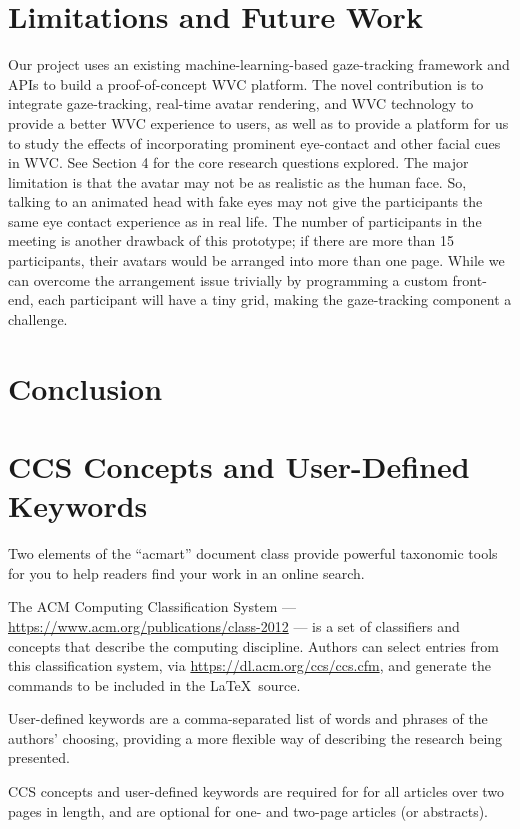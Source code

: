 \documentclass[sigconf,authordraft]{acmart}
\begin{document}
\section{Limitations and Future Work}
Our project uses an existing machine-learning-based gaze-tracking framework and APIs to build a proof-of-concept WVC platform. The novel contribution is to integrate gaze-tracking, real-time avatar rendering, and WVC technology to provide a better WVC experience to users, as well as to provide a platform for us to study the effects of incorporating prominent eye-contact and other facial cues in WVC. See Section 4 for the core research questions explored.
The major limitation is that the avatar may not be as realistic as the human face. So, talking to an animated head with fake eyes may not give the participants the same eye contact experience as in real life. The number of participants in the meeting is another drawback of this prototype; if there are more than 15 participants, their avatars would be arranged into more than one page. While we can overcome the arrangement issue trivially by programming a custom front-end, each participant will have a tiny grid, making the gaze-tracking component a challenge. 

\section{Conclusion}

\section{CCS Concepts and User-Defined Keywords}

Two elements of the ``acmart'' document class provide powerful
taxonomic tools for you to help readers find your work in an online
search.

The ACM Computing Classification System ---
\url{https://www.acm.org/publications/class-2012} --- is a set of
classifiers and concepts that describe the computing
discipline. Authors can select entries from this classification
system, via \url{https://dl.acm.org/ccs/ccs.cfm}, and generate the
commands to be included in the \LaTeX\ source.

User-defined keywords are a comma-separated list of words and phrases
of the authors' choosing, providing a more flexible way of describing
the research being presented.

CCS concepts and user-defined keywords are required for for all
articles over two pages in length, and are optional for one- and
two-page articles (or abstracts).
\end{document}
